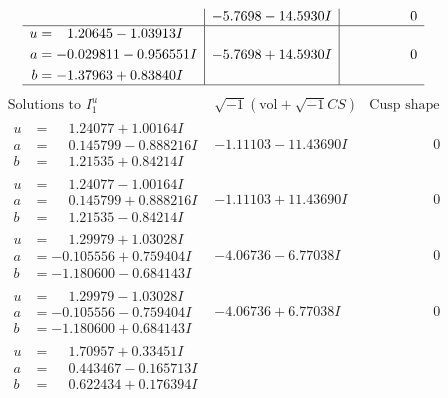 \documentclass[1p]{elsarticle_modified}
\theoremstyle{definition}
\newcommand{\I}{\sqrt{-1}}
\begin{document}
$$\begin{array}{c|c|c}
 & -5.7698 - 14.5930 I & \phantom{-0.000000 } 0 \\ \hline\begin{aligned}
u &= \phantom{-}1.20645 - 1.03913 I \\
a &= -0.029811 - 0.956551 I \\
b &= -1.37963 + 0.83840 I\end{aligned}
 & -5.7698 + 14.5930 I & \phantom{-0.000000 } 0\\
 \hline 
 \end{array}$$\newpage$$\begin{array}{c|c|c}  
\text{Solutions to }I^u_{1}& \I (\text{vol} + \sqrt{-1}CS) & \text{Cusp shape}\\
 \hline 
\begin{aligned}
u &= \phantom{-}1.24077 + 1.00164 I \\
a &= \phantom{-}0.145799 - 0.888216 I \\
b &= \phantom{-}1.21535 + 0.84214 I\end{aligned}
 & -1.11103 - 11.43690 I & \phantom{-0.000000 } 0 \\ \hline\begin{aligned}
u &= \phantom{-}1.24077 - 1.00164 I \\
a &= \phantom{-}0.145799 + 0.888216 I \\
b &= \phantom{-}1.21535 - 0.84214 I\end{aligned}
 & -1.11103 + 11.43690 I & \phantom{-0.000000 } 0 \\ \hline\begin{aligned}
u &= \phantom{-}1.29979 + 1.03028 I \\
a &= -0.105556 + 0.759404 I \\
b &= -1.180600 - 0.684143 I\end{aligned}
 & -4.06736 - 6.77038 I & \phantom{-0.000000 } 0 \\ \hline\begin{aligned}
u &= \phantom{-}1.29979 - 1.03028 I \\
a &= -0.105556 - 0.759404 I \\
b &= -1.180600 + 0.684143 I\end{aligned}
 & -4.06736 + 6.77038 I & \phantom{-0.000000 } 0 \\ \hline\begin{aligned}
u &= \phantom{-}1.70957 + 0.33451 I \\
a &= \phantom{-}0.443467 - 0.165713 I \\
b &= \phantom{-}0.622434 + 0.176394 I\end{aligned}

\end{array}$$
\end{document}
